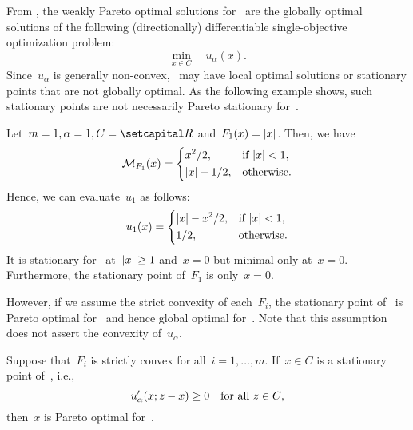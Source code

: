 \documentclass[../../main]{subfiles}
\begin{document}
From , the weakly Pareto optimal solutions for~ are the globally optimal solutions of the following (directionally) differentiable single-objective optimization problem:
\begin{equation} \label{eq:min_reg_gap}
    \min_{x \in C} \quad u_\alpha(x)
.\end{equation} 
Since~$u_\alpha$ is generally non-convex,~ may have local optimal solutions or stationary points that are not globally optimal.
As the following example shows, such stationary points are not necessarily Pareto stationary for~.
\begin{example} 
    Let~$m = 1, \alpha = 1, C = \setR$ and~$F_1(x) = \lvert x\rvert$.
    Then, we have
    \begin{equation}
        \operatorname{\mathcal{M}}_{F_1}(x) = \begin{dcases}
            x^2 / 2, & \text{if } \lvert x\rvert < 1, \\
            \lvert x\rvert - 1 / 2, & \text{otherwise}
        .\end{dcases}
    \end{equation}
    Hence, we can evaluate~$u_1$ as follows:
    \begin{equation}
        u_1(x) = \begin{dcases}
            \lvert x\rvert - x^2 / 2, & \text{if } \lvert x\rvert < 1, \\
            1 / 2, & \text{otherwise}
        .\end{dcases}
    \end{equation} 
    It is stationary for~ at~$\lvert x\rvert \ge 1$ and~$x = 0$ but minimal only at~$x = 0$.
    Furthermore, the stationary point of~$F_1$ is only~$x = 0$.
\end{example}
However, if we assume the strict convexity of each~$F_i$, the stationary point of~ is Pareto optimal for~ and hence global optimal for~.
Note that this assumption does not assert the convexity of~$u_\alpha$.
\begin{theorem} 
    Suppose that~$F_i$ is strictly convex for all~$i = 1, \dots, m$.
    If~$x \in C$ is a stationary point of~, i.e.,
    \begin{equation}
        u_\alpha'(x; z - x) \ge 0 \quad \text{for all~$z \in C$}
    ,\end{equation}
    then~$x$ is Pareto optimal for~.
\end{theorem}
\end{document}
